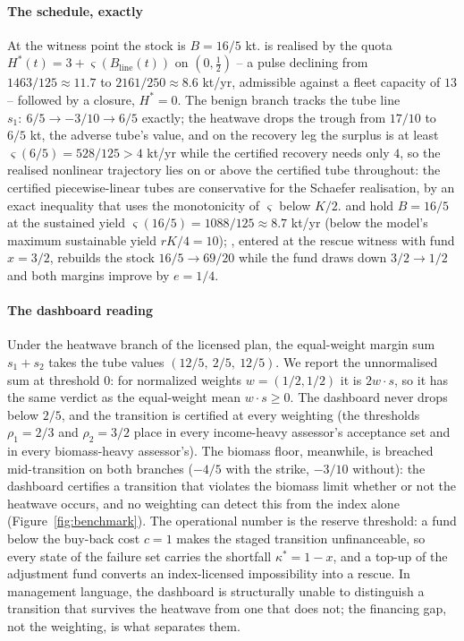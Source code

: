 \paragraph{The schedule, exactly} At the witness point the stock is $B=16/5$ kt.  is realised by the quota $H^*(t)=3+\varsigma(B_{\mathrm{line}}(t))$ on $(0,\tfrac12)$ -- a pulse declining from $1463/125\approx11.7$ to $2161/250\approx8.6$ kt/yr, admissible against a fleet capacity of $13$ -- followed by a closure, $H^*=0$. The benign branch tracks the tube line $s_1:\ 6/5\to-3/10\to6/5$ exactly; the heatwave drops the trough from $17/10$ to $6/5$ kt, the adverse tube's value, and on the recovery leg the surplus is at least $\varsigma(6/5)=528/125>4$ kt/yr while the certified recovery needs only $4$, so the realised nonlinear trajectory lies on or above the certified tube throughout: the certified piecewise-linear tubes are conservative for the Schaefer realisation, by an exact inequality that uses the monotonicity of $\varsigma$ below $K/2$.  and  hold $B=16/5$ at the sustained yield $\varsigma(16/5)=1088/125\approx8.7$ kt/yr (below the model's maximum sustainable yield $rK/4=10$); , entered at the rescue witness with fund $x=3/2$, rebuilds the stock $16/5\to69/20$ while the fund draws down $3/2\to1/2$ and both margins improve by $e=1/4$.

\paragraph{The dashboard reading} Under the heatwave branch of the licensed plan, the equal-weight margin sum $s_1+s_2$ takes the tube values $(12/5,\ 2/5,\ 12/5)$. We report the unnormalised sum at threshold $0$: for normalized weights $w=(1/2,1/2)$ it is $2w\cdot s$, so it has the same verdict as the equal-weight mean $w\cdot s\ge0$. The dashboard never drops below $2/5$, and the transition is certified at every weighting (the thresholds $\rho_1=2/3$ and $\rho_2=3/2$ place  in every income-heavy assessor's acceptance set and  in every biomass-heavy assessor's). The biomass floor, meanwhile, is breached mid-transition on both branches ($-4/5$ with the strike, $-3/10$ without): the dashboard certifies a transition that violates the biomass limit whether or not the heatwave occurs, and no weighting can detect this from the index alone (Figure~\ref{fig:benchmark}). The operational number is the reserve threshold: a fund below the buy-back cost $c=1$ makes the staged transition unfinanceable, so every state of the failure set carries the shortfall $\kappa^*=1-x$, and a top-up of the adjustment fund converts an index-licensed impossibility into a rescue. In management language, the dashboard is structurally unable to distinguish a transition that survives the heatwave from one that does not; the financing gap, not the weighting, is what separates them.

